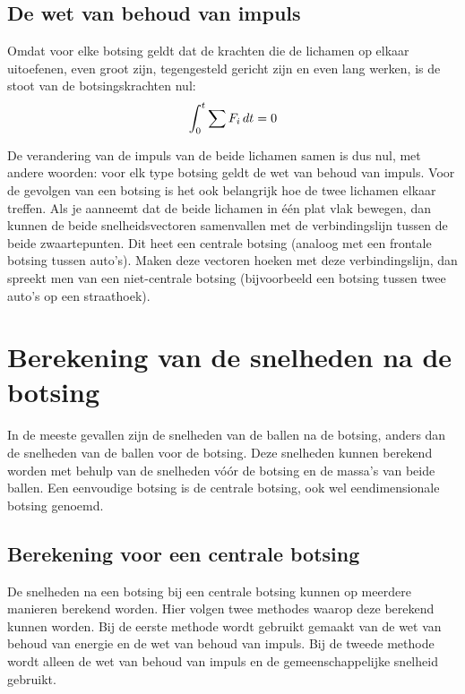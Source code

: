 \documentclass[12pt,a4paper]{article}
\begin{document}
	\subsection{De wet van behoud van impuls}
	Omdat voor elke botsing geldt dat de krachten die de lichamen op elkaar uitoefenen, even groot zijn, tegengesteld gericht zijn en even lang werken, is de stoot van de botsingskrachten nul:
	\begin{equation}
		  \int_0^t \sum F_i\,dt = 0\\
	\end{equation}

	De verandering van de impuls van de beide lichamen samen is dus nul, met andere woorden: voor elk type botsing geldt de wet van behoud van impuls.
	Voor de gevolgen van een botsing is het ook belangrijk hoe de twee lichamen elkaar treffen. Als je aanneemt dat de beide lichamen in \'{e}\'{e}n plat vlak bewegen, dan kunnen de beide snelheidsvectoren samenvallen met de verbindingslijn tussen de beide zwaartepunten. Dit heet een centrale botsing (analoog met een frontale botsing tussen auto's). Maken deze vectoren hoeken met deze verbindingslijn, dan spreekt men van een niet-centrale botsing (bijvoorbeeld een botsing tussen twee auto's op een straathoek).
	
	\newpage
	
	\section{Berekening van de snelheden na de botsing}
	In de meeste gevallen zijn de snelheden van de ballen na de botsing, anders dan de snelheden van de ballen voor de botsing. Deze snelheden kunnen berekend worden met behulp van de snelheden v\'{o}\'{o}r de botsing en de massa's van beide ballen. Een eenvoudige botsing is de centrale botsing, ook wel eendimensionale botsing genoemd.

	\subsection{Berekening voor een centrale botsing}
	De snelheden na een botsing bij een centrale botsing kunnen op meerdere manieren berekend worden. Hier volgen twee methodes waarop deze berekend kunnen worden. Bij  de eerste methode wordt gebruikt gemaakt van de wet van behoud van energie en de wet van behoud van impuls. Bij de tweede methode wordt alleen de wet van behoud van impuls en de gemeenschappelijke snelheid gebruikt.
\end{document}
